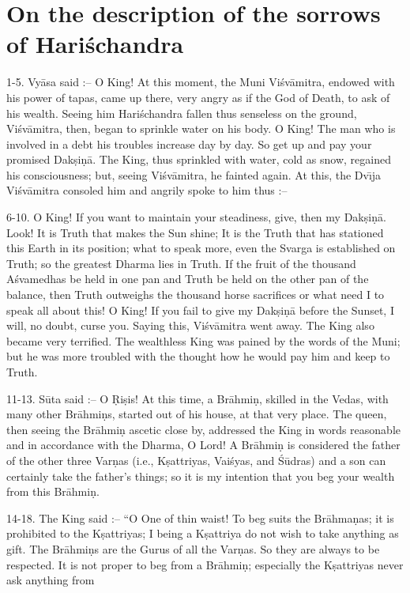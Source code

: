 \chapter{On the description of the sorrows of Hari\'schandra}

1-5. Vy\=asa said :-- O King! At this moment, the Muni Vi\'sv\=amitra, endowed with his power of tapas, came up there, very angry as if the God of Death, to ask of his wealth. Seeing him Hari\'schandra fallen thus senseless on the ground, Vi\'sv\=amitra, then, began to sprinkle water on his body. O King! The man who is involved in a debt his troubles increase day by day. So get up and pay your promised Dak\d{s}i\d{n}\=a. The King, thus sprinkled with water, cold as snow, regained his consciousness; but, seeing Vi\'sv\=amitra, he fainted again. At this, the Dv\={\i}ja Vi\'sv\=amitra consoled him and angrily spoke to him thus :--

6-10. O King! If you want to maintain your steadiness, give, then my Dak\d{s}i\d{n}\=a. Look! It is Truth that makes the Sun shine; It is the Truth that has stationed this Earth in its position; what to speak more, even the Svarga is established on Truth; so the greatest Dharma lies in Truth. If the fruit of the thousand A\'svamedhas be held in one pan and Truth be held on the other pan of the balance, then Truth outweighs the thousand horse sacrifices or what need I to speak all about this! O King! If you fail to give my Dak\d{s}i\d{n}\=a before the Sunset, I will, no doubt, curse you. Saying this, Vi\'sv\=amitra went away. The King also became very terrified. The wealthless King was pained by the words of the Muni; but he was more troubled with the thought how he would pay him and keep to Truth.

11-13. S\=uta said :-- O \d{R}i\d{s}is! At this time, a Br\=ahmi\d{n}, skilled in the Vedas, with many other Br\=ahmi\d{n}s, started out of his house, at that very place. The queen, then seeing the Br\=ahmi\d{n} ascetic close by, addressed the King in words reasonable and in accordance with the Dharma, O Lord! A Br\=ahmi\d{n} is considered the father of the other three Var\d{n}as (i.e., K\d{s}attriyas, Vai\'syas, and \'S\=udras) and a son can certainly take the father's things; so it is my intention that you beg your wealth from this Br\=ahmi\d{n}.

14-18. The King said :-- ``O One of thin waist! To beg suits the Br\=ahma\d{n}as; it is prohibited to the K\d{s}attriyas; I being a K\d{s}attriya do not wish to take anything as gift. The Br\=ahmi\d{n}s are the Gurus of all the Var\d{n}as. So they are always to be respected. It is not proper to beg from a Br\=ahmi\d{n}; especially the K\d{s}attriyas never ask anything from

